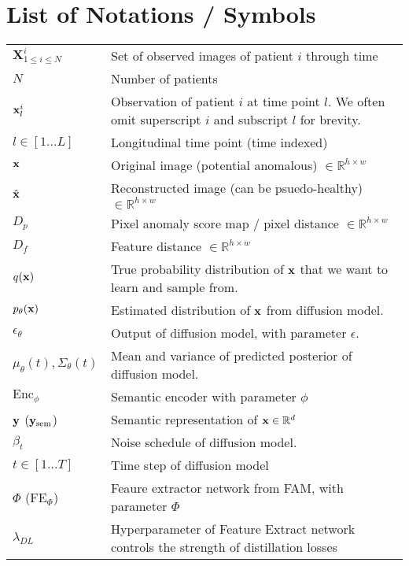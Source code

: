 \documentclass[11pt, a4paper, openany]{book}
\begin{document}
\chapter*{List of Notations / Symbols}
\begin{tabular}{l@{\hspace{1.5cm}}p{13cm}}
  $\mathbf{X}^i_{1 \leq i \leq N}$ & Set of observed images of patient $i$ through time \\
  $N$ & Number of patients \\
  ${\mathbf{x}}^i_l$ & Observation of patient $i$ at time point $l$. We often omit superscript $i$ and subscript $l$ for brevity. \\
  $l \in [1 \dots L]$ & Longitudinal time point (time indexed) \\
  ${\mathbf{x}}$      & Original image (potential anomalous) $\in \mathbb{R}^{h \times w}$ \\
  $\hat{{\mathbf{x}}}$      & Reconstructed image (can be psuedo-healthy) $\in \mathbb{R}^{h \times w}$\\
  $D_p$      & Pixel anomaly score map / pixel distance $\in \mathbb{R}^{h \times w}$\\
  $D_f$ & Feature distance $\in \mathbb{R}^{h \times w}$\\
  $q({\mathbf{x}})$ & True probability distribution of ${\mathbf{x}}$ that we want to learn and sample from. \\
  $p_{\theta}({\mathbf{x}})$ & Estimated distribution of ${\mathbf{x}}$ from diffusion model. \\
  $\epsilon_{\theta}$ & Output of diffusion model, with parameter $\epsilon$. \\
  $\mu_{\theta}(t), \Sigma_{\theta}(t)$ & Mean and variance of predicted posterior of diffusion model. \\
  $\text{Enc}_{\phi}$ & Semantic encoder with parameter $\phi$ \\
  ${\mathbf{y}}$ (${\mathbf{y}}_{\text{sem}}$) & Semantic representation of ${\mathbf{x}} \in \mathbb{R}^d$ \\
  $\beta_t$ & Noise schedule of diffusion model. \\
  $t \in [1 \dots T]$ & Time step of diffusion model \\
  $\Phi$ ($\text{FE}_{\Phi}$) & Feaure extractor network from FAM, with parameter $\Phi$ \\
  $\lambda_{DL}$ & Hyperparameter of Feature Extract network controls the strength of distillation losses \\

\end{tabular}
\end{document}
